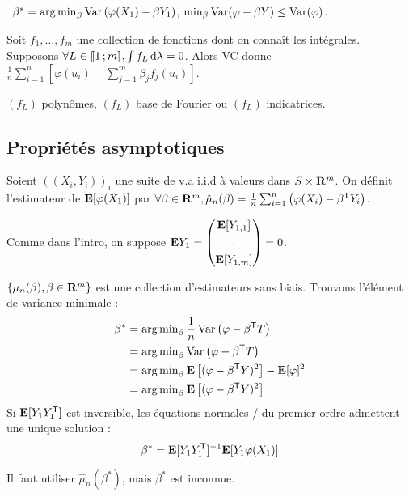 	\textrightarrow\ $\beta^* = \operatorname{arg\, min}_\beta \operatorname{Var} \left( \varphi(X_1) - \beta Y_1 \right)$, $\min_\beta \operatorname{Var}(\varphi - \beta Y) \leq \operatorname{Var}(\varphi)$.
	
	Soit $f_1,\ldots,f_m$ une collection de fonctions dont on connaît les intégrales.
	Supposons $\forall L \in \mathopen{[\![}1\mathclose{}\mathpunct{};m\mathclose{]\!]}, \int f_L \mathop{}\mathopen{}\mathrm{d} \lambda = 0$.
	Alors VC donne $\frac{1}{n} \sum_{i = 1}^n \left[ \varphi(u_i) - \sum_{j = 1}^m \beta_j f_j(u_i) \right]$.
	
	\begin{ex}
		$(f_L)$ polynômes, $(f_L)$ base de Fourier ou $(f_L)$ indicatrices.
	\end{ex}


\subsection{Propriétés asymptotiques}

	Soient $((X_i,Y_i))_i$ une suite de v.a i.i.d à valeurs dans $S \times \mathbf{R}^m$.
	On définit l'estimateur de $\mathbf{E}[\varphi(X_1)]$ par $\forall \beta \in \mathbf{R}^m, \hat{\mu}_n(\beta) = \frac{1}{n} \sum_{i = 1}^n \left( \varphi(X_i) - \beta^\mathsf{T}Y_i \right)$.

	Comme dans l'intro, on suppose $\mathbf{E} Y_1 = \begin{pmatrix}
		\mathbf{E}[Y_{1,1}] \\ \vdots \\ \mathbf{E}[Y_{1,m}]
		\end{pmatrix} = 0$.
		
	$\{ \mu_n(\beta), \beta \in \mathbf{R}^m \}$ est une collection d'estimateurs sans biais.
	Trouvons l'élément de variance minimale :
	\begin{align*}
		\beta^* & = \operatorname{arg\, min}_\beta \frac{1}{n} \operatorname{Var} \left( \varphi - \beta^\mathsf{T} T \right) \\
		        & = \operatorname{arg\, min}_\beta \operatorname{Var} \left( \varphi - \beta^\mathsf{T} T \right) \\
		        & = \operatorname{arg\, min}_\beta \mathbf{E} \left[ (\varphi - \beta^\mathsf{T} Y)^2 \right] - \mathbf{E}[\varphi]^2 \\
		        & = \operatorname{arg\, min}_\beta \mathbf{E} \left[ (\varphi - \beta^\mathsf{T} Y)^2 \right]
	\end{align*}
	Si $\mathbf{E}[Y_1 Y_1^\mathsf{T}]$ est inversible, les équations normales / du premier ordre admettent une unique solution :
	$$\beta^* = \mathbf{E}[Y_1 Y_1^\mathsf{T}]^{-1} \mathbf{E}[Y_1 \varphi(X_1)]$$
	
	Il faut utiliser $\hat{\mu}_n(\beta^*)$, mais $\beta^*$ est inconnue.
	

